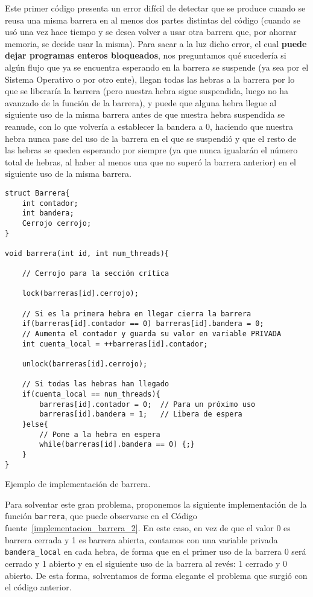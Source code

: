 Este primer código presenta un error difícil de detectar que se produce cuando se reusa una misma barrera en al menos dos partes distintas del código (cuando se usó una vez hace tiempo y se desea volver a usar otra barrera que, por ahorrar memoria, se decide usar la misma). Para sacar a la luz dicho error, el cual \textbf{puede dejar programas enteros bloqueados}, nos preguntamos qué sucedería si algún flujo que ya se encuentra esperando en la barrera se suspende (ya sea por el Sistema Operativo o por otro ente), llegan todas las hebras a la barrera por lo que se liberaría la barrera (pero nuestra hebra sigue suspendida, luego no ha avanzado de la función de la barrera), y puede que alguna hebra llegue al siguiente uso de la misma barrera antes de que nuestra hebra suspendida se reanude, con lo que volvería a establecer la bandera a 0, haciendo que nuestra hebra nunca pase del uso de la barrera en el que se suspendió y que el resto de las hebras se queden esperando por siempre (ya que nunca igualarán el número total de hebras, al haber al menos una que no superó la barrera anterior) en el siguiente uso de la misma barrera.\\

\begin{listing}
\begin{verbatim}
struct Barrera{
    int contador;
    int bandera;
    Cerrojo cerrojo;
}

void barrera(int id, int num_threads){

    // Cerrojo para la sección crítica

    lock(barreras[id].cerrojo);

    // Si es la primera hebra en llegar cierra la barrera
    if(barreras[id].contador == 0) barreras[id].bandera = 0;
    // Aumenta el contador y guarda su valor en variable PRIVADA
    int cuenta_local = ++barreras[id].contador;

    unlock(barreras[id].cerrojo);

    // Si todas las hebras han llegado
    if(cuenta_local == num_threads){
        barreras[id].contador = 0;  // Para un próximo uso
        barreras[id].bandera = 1;   // Libera de espera
    }else{
        // Pone a la hebra en espera
        while(barreras[id].bandera == 0) {;}
    }
}
\end{verbatim}
\caption{Ejemplo de implementación de barrera.}
\label{implementacion_barrera_1}
\end{listing}

Para solventar este gran problema, proponemos la siguiente implementación de la función \verb|barrera|, que puede observarse en el Código fuente~\ref{implementacion_barrera_2}. En este caso, en vez de que el valor 0 es barrera cerrada y 1 es barrera abierta, contamos con una variable privada \verb|bandera_local| en cada hebra, de forma que en el primer uso de la barrera 0 será cerrado y 1 abierto y en el siguiente uso de la barrera al revés: 1 cerrado y 0 abierto. De esta forma, solventamos de forma elegante el problema que surgió con el código anterior.

